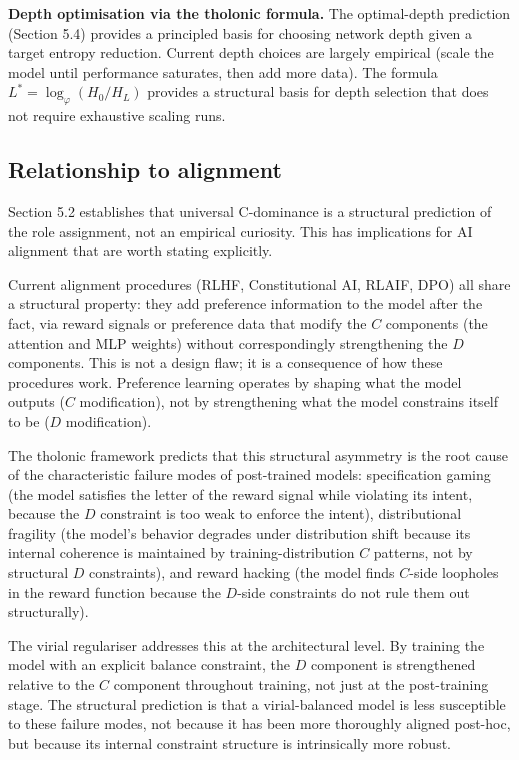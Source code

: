 \documentclass[12pt]{article}
\begin{document}
\textbf{Depth optimisation via the tholonic formula.} The optimal-depth
prediction (Section 5.4) provides a principled basis for choosing
network depth given a target entropy reduction. Current depth choices
are largely empirical (scale the model until performance saturates, then
add more data). The formula \(L^* = \log_\varphi(H_0/H_L)\) provides a
structural basis for depth selection that does not require exhaustive
scaling runs.

\subsection{Relationship to alignment}\label{relationship-to-alignment}

Section 5.2 establishes that universal C-dominance is a structural
prediction of the role assignment, not an empirical curiosity. This has
implications for AI alignment that are worth stating explicitly.

Current alignment procedures (RLHF, Constitutional AI, RLAIF, DPO) all
share a structural property: they add preference information to the
model after the fact, via reward signals or preference data that modify
the \(C\) components (the attention and MLP weights) without
correspondingly strengthening the \(D\) components. This is not a design
flaw; it is a consequence of how these procedures work. Preference
learning operates by shaping what the model outputs (\(C\)
modification), not by strengthening what the model constrains itself to
be (\(D\) modification).

The tholonic framework predicts that this structural asymmetry is the
root cause of the characteristic failure modes of post-trained models:
specification gaming (the model satisfies the letter of the reward
signal while violating its intent, because the \(D\) constraint is too
weak to enforce the intent), distributional fragility (the model's
behavior degrades under distribution shift because its internal
coherence is maintained by training-distribution \(C\) patterns, not by
structural \(D\) constraints), and reward hacking (the model finds
\(C\)-side loopholes in the reward function because the \(D\)-side
constraints do not rule them out structurally).

The virial regulariser addresses this at the architectural level. By
training the model with an explicit balance constraint, the \(D\)
component is strengthened relative to the \(C\) component throughout
training, not just at the post-training stage. The structural prediction
is that a virial-balanced model is less susceptible to these failure
modes, not because it has been more thoroughly aligned post-hoc, but
because its internal constraint structure is intrinsically more robust.
\end{document}
